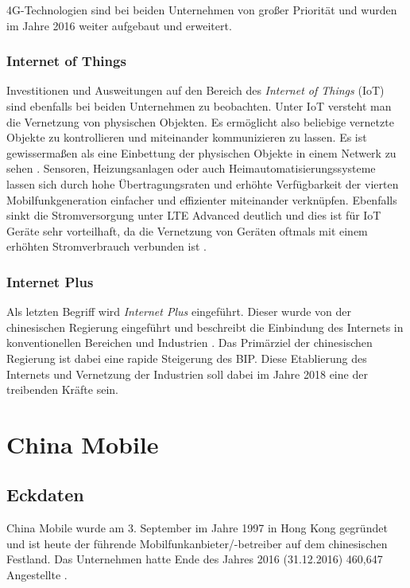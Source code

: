 4G-Technologien sind bei beiden Unternehmen von großer Priorität und wurden im Jahre 2016 weiter aufgebaut und erweitert.

\subsubsection{Internet of Things}

Investitionen und Ausweitungen auf den Bereich des \textit{Internet of Things} (IoT) sind ebenfalls bei beiden Unternehmen zu beobachten. Unter IoT versteht man die Vernetzung von physischen Objekten. Es ermöglicht also beliebige vernetzte Objekte zu kontrollieren und miteinander kommunizieren zu lassen. Es ist gewissermaßen als eine Einbettung der physischen Objekte in einem Netwerk zu sehen \cite{iotcisco}. Sensoren, Heizungsanlagen oder auch Heimautomatisierungssysteme lassen sich durch hohe Übertragungsraten und erhöhte Verfügbarkeit der vierten Mobilfunkgeneration einfacher und effizienter miteinander verknüpfen. Ebenfalls sinkt die Stromversorgung unter LTE Advanced deutlich und dies ist für IoT Geräte sehr vorteilhaft, da die Vernetzung von Geräten oftmals mit einem erhöhten Stromverbrauch verbunden ist \cite{energy}.  

\subsubsection{Internet Plus}

Als letzten Begriff wird \textit{Internet Plus} eingeführt. Dieser wurde von der chinesischen Regierung eingeführt und beschreibt die Einbindung des Internets in konventionellen Bereichen und Industrien \cite{internetplus}. Das Primärziel der chinesischen Regierung ist dabei eine rapide Steigerung des BIP. Diese Etablierung des Internets und Vernetzung der Industrien soll dabei im Jahre 2018 eine der treibenden Kräfte sein.  

\section{China Mobile}
\label{sec:china}
\subsection{Eckdaten}

China Mobile wurde am 3. September im Jahre 1997 in Hong Kong gegründet und ist heute der führende Mobilfunkanbieter/-betreiber auf dem chinesischen Festland. Das Unternehmen hatte Ende des Jahres 2016 (31.12.2016) 460,647 Angestellte \cite{chinasite}.

